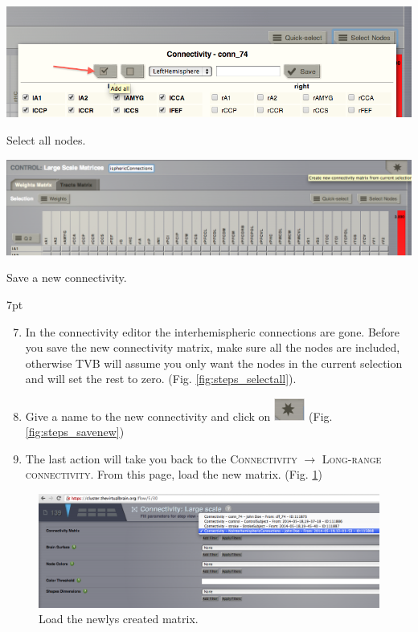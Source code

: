 \documentclass{tufte-handout}
\newenvironment{formal}{%
  \def\FrameCommand{%
    \hspace{1pt}%
    {\color{DarkBlue}\vrule width 2pt}%
    {\color{formalshade}\vrule width 4pt}%
    \colorbox{formalshade}%
  }%
  \MakeFramed{\advance\hsize-\width\FrameRestore}%
  \noindent\hspace{-4.55pt}%
  \begin{adjustwidth}{}{7pt}%
  \vspace{2pt}\vspace{2pt}%
}
{%
  \vspace{2pt}\end{adjustwidth}\endMakeFramed%
}
\begin{document}
\begin{marginfigure}%
  \includegraphics[width=\linewidth]{Handout_UI_ModellingStructuralLesions_SelectAllNodes}
    \caption{Select all nodes.}
  \label{fig:steps_selectall}
  \end{marginfigure}
  \begin{marginfigure}
 \includegraphics[width=\linewidth]{Handout_UI_ModellingStructuralLesions_SaveNewMatrix}
  \caption{Save a new connectivity.}
  \label{fig:steps_savenew}
\end{marginfigure}

\begin{formal}
  \begin{enumerate}[resume]
  \setcounter{enumi}{6}
    \item In the connectivity editor the interhemispheric connections are gone.
    Before you save the new connectivity matrix, make sure all the nodes are
included, otherwise TVB will assume you only want the nodes in the current
selection and will set the rest to zero. (Fig. \ref{fig:steps_selectall}).
   \item Give a name to the new connectivity and click on \includegraphics[width=0.08\textwidth]{butt_star_create.png} (Fig. \ref{fig:steps_savenew})
    \item The last action will take you back to the \textsc{Connectivity} $\rightarrow$ \textsc{Long-range connectivity}. From this page, load the new matrix. (Fig. \ref{fig:steps_07})
  \end{enumerate}
\end{formal}


\begin{figure}[h]
  \includegraphics[width=\linewidth]{Handout_UI_ModellingStructuralLesions_LoadNewMatrix}%
  \caption{Load the newlys created matrix.}%
  \label{fig:steps_07}%
\end{figure}
\end{document}

